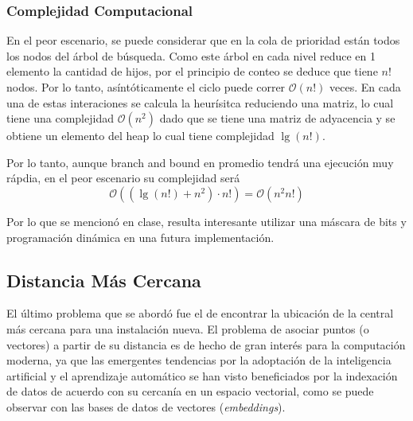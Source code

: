 \documentclass[12pt]{article}
\begin{document}
  \subsubsection{Complejidad Computacional}
  En el peor escenario, se puede considerar que en la cola de prioridad están todos
  los nodos del árbol de búsqueda. Como este árbol en cada nivel reduce en 1 elemento 
  la cantidad de hijos, por el principio de conteo se deduce que tiene $n!$ nodos. Por lo tanto,
  asíntóticamente el ciclo puede correr $\mathcal{O}(n!)$ veces. En cada una de estas interaciones
  se calcula la heurísitca reduciendo una matriz, lo cual tiene una complejidad $\mathcal{O}(n^2)$ dado que se tiene
  una matriz de adyacencia y se obtiene un elemento del heap lo cual tiene complejidad $\lg(n!)$.

  Por lo tanto, aunque branch and bound en promedio tendrá una ejecución muy rápdia, en el peor escenario
  su complejidad será
  \begin{equation}
    \mathcal{O}\left(\left(\lg(n!) + n^2\right) \cdot n!\right) = \mathcal{O}\left(n^2n!\right)
  \end{equation}

  Por lo que se mencionó en clase, resulta interesante utilizar una máscara de bits y programación dinámica en una futura
  implementación.

  \subsection{Distancia Más Cercana}
  El último problema que se abordó fue el de encontrar la ubicación de la central más cercana para una instalación nueva. El problema de asociar puntos (o vectores) a partir de su distancia 
  es de hecho de gran interés para la computación moderna, ya que las emergentes tendencias por la adoptación de la inteligencia artificial y el aprendizaje automático se han visto beneficiados
  por la indexación de datos de acuerdo con su cercanía en un espacio vectorial, como se puede observar con las bases de datos de vectores (\textit{embeddings}). 
  
\end{document}
